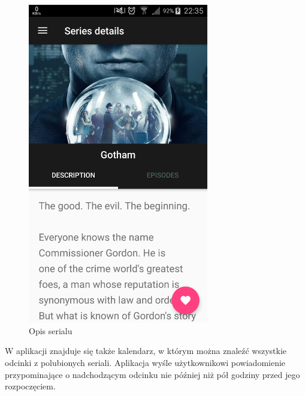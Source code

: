 \documentclass[10pt,a4paper]{article}
\begin{document}
\begin{figure}[H]
\centering
\includegraphics[height=14cm]{Resources/Images/details.png}
\caption{Opis serialu}
\end{figure}
\noindent
W aplikacji znajduje się także kalendarz, w którym można znaleźć wszystkie odcinki z polubionych seriali. Aplikacja wyśle użytkownikowi powiadomienie przypominające o nadchodzącym odcinku nie później niż pół godziny przed jego rozpoczęciem.

\newpage
\end{document}
